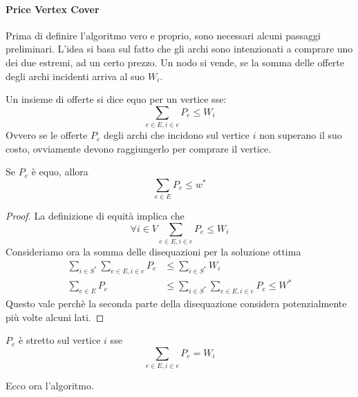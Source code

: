 \paragraph{Price Vertex Cover}
Prima di definire l'algoritmo vero e proprio, sono necessari alcuni passaggi preliminari.
L'idea si basa sul fatto che gli archi sono intenzionati a comprare uno dei due estremi,
ad un certo prezzo.
Un nodo si vende, se la somma delle offerte degli archi incidenti arriva al suo $W_i$.
\begin{definition}
    Un insieme di offerte si dice equo per un vertice sse:
    $$\sum_{e\in E, i \in e}P_e \leq W_i$$
    Ovvero se le offerte $P_e$ degli archi che incidono sul vertice $i$ 
    non superano il suo costo, ovviamente devono raggiungerlo per comprare 
    il vertice.    
\end{definition}
\begin{lemma}
    \label{pscl1}
    Se $P_e$ è equo, allora
    $$\sum_{e \in E} P_e \leq w^*$$
\end{lemma}
\begin{proof}
    La definizione di equità implica che
    $$\forall i \in V \sum_{e\in E, i \in e}P_e \leq W_i$$
    Consideriamo ora la somma delle disequazioni per la soluzione ottima
\begin{equation}
    \begin{aligned}
        \sum_{i \in S^*} \sum_{e\in E, i \in e}P_e &\leq \sum_{i \in S^*}W_i\\
        \sum_{e \in E} P_e &\leq \sum_{i \in S^*} \sum_{e\in E, i \in e}P_e \leq W^*
    \end{aligned}
\end{equation}
Questo vale perchè la seconda parte della disequazione considera potenzialmente più volte alcuni lati.
\end{proof}
\begin{definition}
    $P_e$ è stretto sul vertice $i$ sse
    $$\sum_{e \in E, i \in e} P_e = W_i$$
\end{definition}
Ecco ora l'algoritmo.

